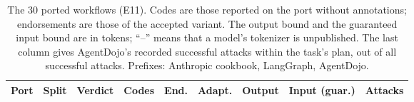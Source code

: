 \begin{table}[p]
\centering
\caption{The 30 ported workflows (E11). Codes are those reported on the port without
annotations; endorsements are those of the accepted variant. The output bound and the
guaranteed input bound are in tokens; ``--'' means that a model's tokenizer is unpublished.
The last column gives AgentDojo's recorded successful attacks within the task's plan, out of
all successful attacks. Prefixes:  Anthropic cookbook,  LangGraph,
 AgentDojo.}
\label{tab:ports}
\scriptsize\setlength{\tabcolsep}{3pt}
\begin{tabular}{@{}llllrlrrl@{}}
\toprule
Port & Split & Verdict & Codes & End. & Adapt. & Output & Input (guar.) & Attacks \\
\midrule

\end{tabular}
\end{table}
